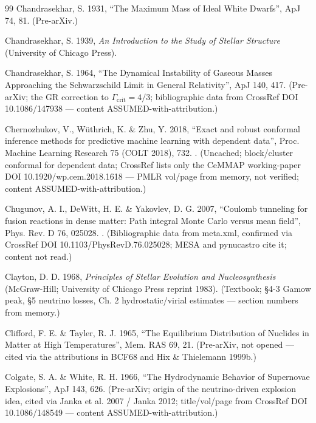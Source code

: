 \begin{thebibliography}{99}
Chandrasekhar, S. 1931, ``The Maximum Mass of Ideal White Dwarfs'', ApJ 74, 81. (Pre-arXiv.)

Chandrasekhar, S. 1939, \emph{An Introduction to the Study of Stellar Structure} (University of Chicago Press).

Chandrasekhar, S. 1964, ``The Dynamical Instability of Gaseous Masses Approaching the Schwarzschild Limit in General Relativity'', ApJ 140, 417. (Pre-arXiv; the GR correction to $\Gamma_{\mathrm{crit}} = 4/3$; bibliographic data from CrossRef DOI 10.1086/147938 --- content ASSUMED-with-attribution.)

Chernozhukov, V., W\"uthrich, K. \& Zhu, Y. 2018, ``Exact and robust conformal inference methods for predictive machine learning with dependent data'', Proc. Machine Learning Research 75 (COLT 2018), 732. . (Uncached; block/cluster conformal for dependent data; CrossRef lists only the CeMMAP working-paper DOI 10.1920/wp.cem.2018.1618 --- PMLR vol/page from memory, not verified; content ASSUMED-with-attribution.)

Chugunov, A. I., DeWitt, H. E. \& Yakovlev, D. G. 2007, ``Coulomb tunneling for fusion reactions in dense matter: Path integral Monte Carlo versus mean field'', Phys. Rev. D 76, 025028. . (Bibliographic data from meta.xml, confirmed via CrossRef DOI 10.1103/PhysRevD.76.025028; MESA  and pynucastro  cite it; content not read.)

Clayton, D. D. 1968, \emph{Principles of Stellar Evolution and Nucleosynthesis} (McGraw-Hill; University of Chicago Press reprint 1983). (Textbook; \S 4-3 Gamow peak, \S 5 neutrino losses, Ch. 2 hydrostatic/virial estimates --- section numbers from memory.)

Clifford, F. E. \& Tayler, R. J. 1965, ``The Equilibrium Distribution of Nuclides in Matter at High Temperatures'', Mem. RAS 69, 21. (Pre-arXiv, not opened --- cited via the attributions in BCF68 and Hix \& Thielemann 1999b.)

Colgate, S. A. \& White, R. H. 1966, ``The Hydrodynamic Behavior of Supernovae Explosions'', ApJ 143, 626. (Pre-arXiv; origin of the neutrino-driven explosion idea, cited via Janka et al. 2007 / Janka 2012; title/vol/page from CrossRef DOI 10.1086/148549 --- content ASSUMED-with-attribution.)


\end{thebibliography}
